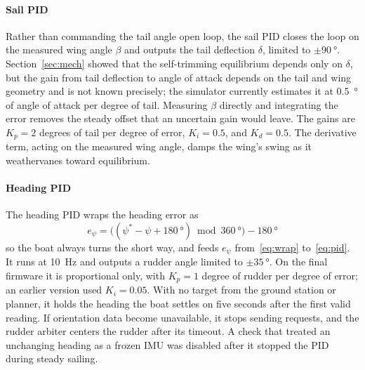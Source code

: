 \paragraph*{Sail PID}
Rather than commanding the tail angle open loop, the sail PID closes the loop
on the measured wing angle $\beta$ and outputs the tail deflection $\delta$,
limited to $\pm\SI{90}{\degree}$. Section~\ref{sec:mech} showed that the
self-trimming equilibrium depends only on $\delta$, but the gain from tail
deflection to angle of attack depends on the tail and wing geometry and is not
known precisely; the simulator currently estimates it at
\SI{0.5}{\degree} of angle of attack per degree of tail. Measuring $\beta$
directly and integrating the error removes the steady offset that an
uncertain gain would leave. The gains are $K_p = 2$ degrees of tail per degree
of error, $K_i = 0.5$, and $K_d = 0.5$. The derivative term, acting on the
measured wing angle, damps the wing's swing as it weathervanes toward
equilibrium.

\paragraph*{Heading PID}
The heading PID wraps the heading error as
\begin{equation}
e_\psi = \bigl((\psi^{*} - \psi + \SI{180}{\degree}) \bmod \SI{360}{\degree}\bigr) - \SI{180}{\degree}
\label{eq:wrap}
\end{equation}
so the boat always turns the short way, and feeds $e_\psi$ from~\eqref{eq:wrap} to~\eqref{eq:pid}. It runs at \SI{10}{\hertz} and outputs a rudder angle limited to
$\pm\SI{35}{\degree}$. On the final firmware it is proportional only, with
$K_p = 1$ degree of rudder per degree of error; an earlier version used
$K_i = 0.05$. With no target from the ground station or planner, it holds the
heading the boat settles on five seconds after the first valid reading. If
orientation data become unavailable, it stops sending requests, and the
rudder arbiter centers the rudder after its timeout. A check that treated an
unchanging heading as a frozen IMU was disabled after it stopped the PID
during steady sailing.

